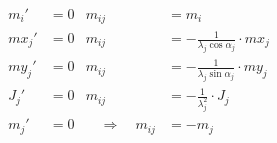 

\begin{subequations}\label{eq:1}
	\begin{alignat}{2}
		m_{i}' &=0   & m_{ij} &= m_{i} \label{sub-eq-1:1}\\
		mx_{j}' &=0  & m_{ij} &= -\frac{1}{\lambda_j\cos\alpha_j}\cdot mx_j \label{sub-eq-2:1} \\
		my_{j}' &= 0 & m_{ij} &= -\frac{1}{\lambda_j\sin\alpha_j}\cdot my_j \label{sub-eq-3:1} \\
		J_{j}' &= 0  & m_{ij} &= -\frac{1}{\lambda_j^2} \cdot J_j \label{sub-eq-4:1} \\
		m_{j}' &= 0  &\quad\Longrightarrow\quad m_{ij} &= -m_j \tag{2}\label{eq:2}
	\end{alignat}
\end{subequations}

